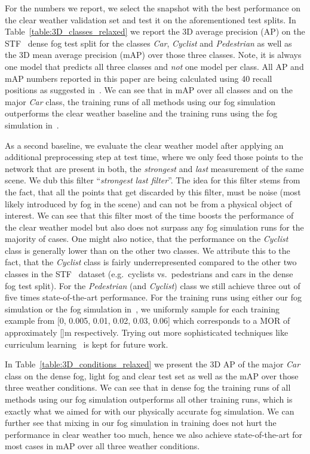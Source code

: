 \documentclass[10pt,twocolumn,letterpaper]{article}
\begin{document}
For the numbers we report, we select the snapshot with the best performance on the clear weather validation set and test it on the aforementioned test splits. In Table~\ref{table:3D_classes_relaxed} we report the 3D average precision (AP) on the STF~\cite{STF} dense fog test split for the classes \textit{Car}, \textit{Cyclist} and \textit{Pedestrian} as well as the 3D mean average precision (mAP) over those three classes. Note, it is always one model that predicts all three classes and \textit{not} one model per class. All AP and mAP numbers reported in this paper are being calculated using 40 recall positions as suggested in~\cite{Simonelli_2019_ICCV}. We can see that in mAP over all classes and on the major \textit{Car} class, the training runs of all methods using our fog simulation outperforms the clear weather baseline and the training runs using the fog simulation in~\cite{STF}. 

As a second baseline, we evaluate the clear weather model after applying an additional preprocessing step at test time, where we only feed those points to the network that are present in both, the \textit{strongest} and \textit{last} measurement of the same scene. We dub this filter ``\textit{strongest}  \textit{last filter}''. The idea for this filter stems from the fact, that all the points that get discarded by this filter, must be noise (most likely introduced by fog in the scene) and can not be from a physical object of interest. We can see that this filter most of the time boosts the performance of the clear weather model but also does not surpass any fog simulation runs for the majority of cases. One might also notice, that the performance on the \textit{Cyclist} class is generally lower than on the other two classes.  We attribute this to the fact, that the \textit{Cyclist} class is fairly underrepresented compared to the other two classes in the STF~\cite{STF} dataset (e.g.\  cyclists vs.\  pedestrians and  cars in the dense fog test split). For the \textit{Pedestrian} (and \textit{Cyclist}) class we still achieve three out of five times state-of-the-art performance. For the training runs using either our fog simulation or the fog simulation in~\cite{STF}, we uniformly sample for each training example  from [0, 0.005, 0.01, 0.02, 0.03, 0.06] which corresponds to a MOR of approximately []m respectively. Trying out more sophisticated techniques like curriculum learning~\cite{Curriculum} is kept for future work.

In Table~\ref{table:3D_conditions_relaxed} we present the 3D AP of the major \textit{Car} class on the dense fog, light fog and clear test set as well as the mAP over those three weather conditions. We can see that in dense fog the training runs of all methods using our fog simulation outperforms all other training runs, which is exactly what we aimed for with our physically accurate fog simulation. We can further see that mixing in our fog simulation in training does not hurt the performance in clear weather too much, hence we also achieve state-of-the-art for most cases in mAP over all three weather conditions. 
\end{document}

